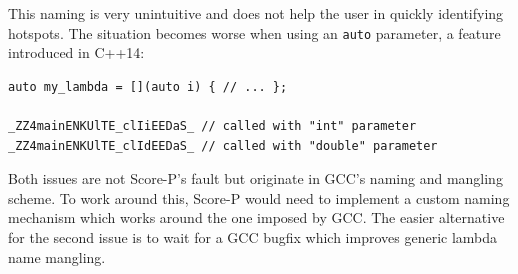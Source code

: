 \noindent This naming is very unintuitive and does not help the user in quickly identifying hotspots. The situation becomes worse when using an \texttt{auto} parameter, a feature introduced in C++14:

\begin{verbatim}
auto my_lambda = [](auto i) { // ... };

_ZZ4mainENKUlTE_clIiEEDaS_ // called with "int" parameter
_ZZ4mainENKUlTE_clIdEEDaS_ // called with "double" parameter
\end{verbatim}

\noindent Both issues are not Score-P's fault but originate in GCC's naming and mangling scheme. To work around this, Score-P would need to implement a custom naming mechanism which works around the one imposed by GCC. The easier alternative for the second issue is to wait for a GCC bugfix which improves generic lambda name mangling.